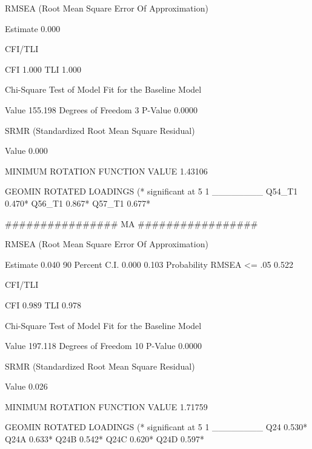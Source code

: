 RMSEA (Root Mean Square Error Of Approximation)

          Estimate                           0.000

CFI/TLI

          CFI                                1.000
          TLI                                1.000

Chi-Square Test of Model Fit for the Baseline Model

          Value                            155.198
          Degrees of Freedom                     3
          P-Value                           0.0000

SRMR (Standardized Root Mean Square Residual)

          Value                              0.000



MINIMUM ROTATION FUNCTION VALUE       1.43106



           GEOMIN ROTATED LOADINGS (* significant at 5%
                  1
              ________
 Q54_T1         0.470*
 Q56_T1         0.867*
 Q57_T1         0.677*

  ################
MA
#################


RMSEA (Root Mean Square Error Of Approximation)

          Estimate                           0.040
          90 Percent C.I.                    0.000  0.103
          Probability RMSEA <= .05           0.522

CFI/TLI

          CFI                                0.989
          TLI                                0.978

Chi-Square Test of Model Fit for the Baseline Model

          Value                            197.118
          Degrees of Freedom                    10
          P-Value                           0.0000

SRMR (Standardized Root Mean Square Residual)

          Value                              0.026



MINIMUM ROTATION FUNCTION VALUE       1.71759



           GEOMIN ROTATED LOADINGS (* significant at 5%
                  1
              ________
 Q24            0.530*
 Q24A           0.633*
 Q24B           0.542*
 Q24C           0.620*
 Q24D           0.597*
